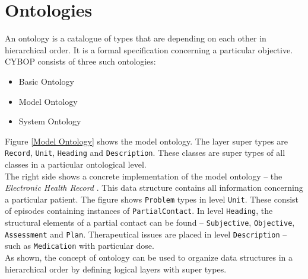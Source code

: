 \section{Ontologies}

An ontology is a catalogue of types that are depending on each other in
hierarchical order. It is a formal specification concerning a particular
objective. CYBOP consists of three such ontologies:
\begin{itemize}
    \item{Basic Ontology}
    \item{Model Ontology}
    \item{System Ontology}
\end{itemize}

Figure \ref{Model Ontology} shows the model ontology. The layer super types
are {\tt Record}, {\tt Unit}, {\tt Heading} and {\tt Description}.
These classes are super types of all classes in a particular ontological level.\\
The right side shows a concrete implementation of the model ontology --
the \emph{Electronic Health Record} \cite{openehr}. This data structure
contains all information concerning a particular patient. The figure shows
{\tt Problem} types in level {\tt Unit}. These consist of episodes containing
instances of {\tt PartialContact}. In level {\tt Heading}, the structural
elements of a partial contact can be found -- {\tt Subjective}, {\tt Objective},
{\tt Assessment} and {\tt Plan}. Therapeutical issues are placed in level
{\tt Description} -- such as {\tt Medication} with particular dose.\\
As shown, the concept of ontology can be used to organize data structures in
a hierarchical order by defining logical layers with super types.
